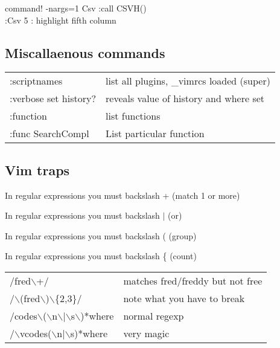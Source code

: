 command! -nargs=1 Csv :call CSVH()\\
:Csv 5 : highlight fifth column

\subsection{Miscallaenous commands}
\begin{center}
\begin{longtable}{l|l}
 :scriptnames & list all plugins, \_vimrcs loaded (super)\\
 :verbose set history? & reveals value of history and where set\\
 :function & list functions\\
 :func SearchCompl & List particular function
\end{longtable}
\end{center}

\subsection{Vim traps}
\begin{list}{}
    \item In regular expressions you must backslash + (match 1 or more)
    \item In regular expressions you must backslash $|$ (or)
    \item In regular expressions you must backslash ( (group)
    \item In regular expressions you must backslash \{ (count)
\end{list}

\begin{center}
\begin{longtable}{l|l}
/fred$\backslash$+/ & matches fred/freddy but not free\\
/$\backslash$(fred$\backslash$)$\backslash$\{2,3\}/ & note what you have to break\\
/codes$\backslash$($\backslash$n$\backslash$|$\backslash$s$\backslash$)*where & normal regexp\\
/$\backslash$vcodes($\backslash$n$|$$\backslash$s)*where & very magic
\end{longtable}
\end{center}

